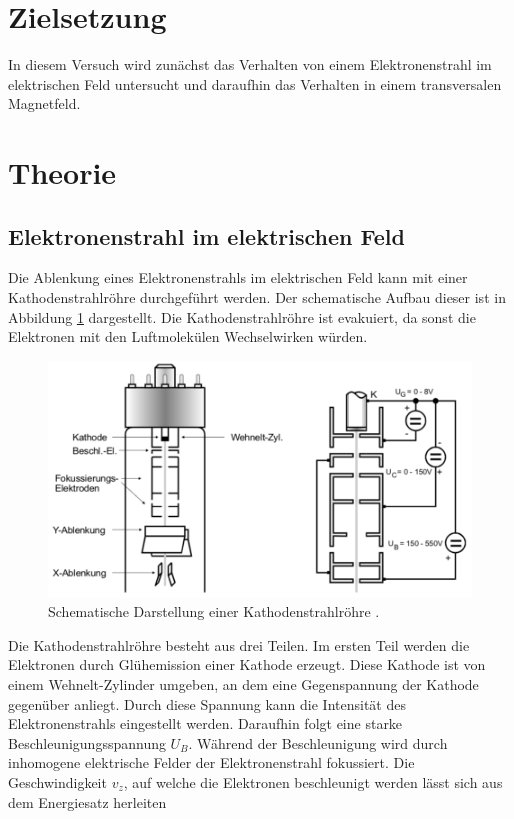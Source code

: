 \section{Zielsetzung}

In diesem Versuch wird zunächst das Verhalten von einem Elektronenstrahl im elektrischen
Feld untersucht und daraufhin das Verhalten in einem transversalen Magnetfeld.

\section{Theorie}

\subsection{Elektronenstrahl im elektrischen Feld}

Die Ablenkung eines Elektronenstrahls im elektrischen Feld kann mit einer
Kathodenstrahlröhre durchgeführt werden. Der schematische Aufbau dieser ist in
Abbildung \ref{abb:1} dargestellt. Die Kathodenstrahlröhre ist evakuiert, da sonst
die Elektronen mit den Luftmolekülen Wechselwirken würden.

\begin{figure}[H]
  \centering
  \includegraphics[width=\textwidth]{content/Kathode.png}
  \caption{Schematische Darstellung einer Kathodenstrahlröhre \cite{1}.}
  \label{abb:1}
\end{figure}

Die Kathodenstrahlröhre besteht aus drei Teilen.
Im ersten Teil werden die Elektronen durch Glühemission einer Kathode erzeugt.
Diese Kathode ist von einem Wehnelt-Zylinder umgeben, an dem eine Gegenspannung
der Kathode gegenüber anliegt. Durch diese Spannung kann die Intensität des Elektronenstrahls
eingestellt werden. Daraufhin folgt eine starke Beschleunigungsspannung $U_B$. Während
der Beschleunigung wird durch inhomogene elektrische Felder der Elektronenstrahl fokussiert.
Die Geschwindigkeit $v_z$, auf welche die Elektronen beschleunigt werden lässt sich aus dem
Energiesatz herleiten

